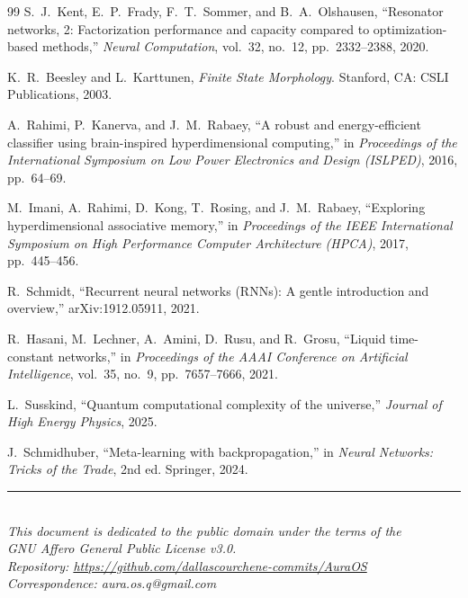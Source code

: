 \documentclass[11pt]{article}
\begin{document}
\begin{thebibliography}{99}
S.~J.~Kent, E.~P.~Frady, F.~T.~Sommer, and B.~A.~Olshausen, ``Resonator networks, 2: Factorization performance and capacity compared to optimization-based methods,'' \textit{Neural Computation}, vol.~32, no.~12, pp.~2332--2388, 2020.

K.~R.~Beesley and L.~Karttunen, \textit{Finite State Morphology}. Stanford, CA: CSLI Publications, 2003.

A.~Rahimi, P.~Kanerva, and J.~M.~Rabaey, ``A robust and energy-efficient classifier using brain-inspired hyperdimensional computing,'' in \textit{Proceedings of the International Symposium on Low Power Electronics and Design (ISLPED)}, 2016, pp.~64--69.

M.~Imani, A.~Rahimi, D.~Kong, T.~Rosing, and J.~M.~Rabaey, ``Exploring hyperdimensional associative memory,'' in \textit{Proceedings of the IEEE International Symposium on High Performance Computer Architecture (HPCA)}, 2017, pp.~445--456.

R.~Schmidt, ``Recurrent neural networks (RNNs): A gentle introduction and overview,'' arXiv:1912.05911, 2021.

R.~Hasani, M.~Lechner, A.~Amini, D.~Rusu, and R.~Grosu, ``Liquid time-constant networks,'' in \textit{Proceedings of the AAAI Conference on Artificial Intelligence}, vol.~35, no.~9, pp.~7657--7666, 2021.

L.~Susskind, ``Quantum computational complexity of the universe,'' \textit{Journal of High Energy Physics}, 2025.

J.~Schmidhuber, ``Meta-learning with backpropagation,'' in \textit{Neural Networks: Tricks of the Trade}, 2nd ed. Springer, 2024.

\end{thebibliography}

\vspace{12pt}
\begin{center}
\rule{0.5\textwidth}{0.4pt}\\[4pt]
\textit{This document is dedicated to the public domain under the terms of the}\\
\textit{GNU Affero General Public License v3.0.}\\[2pt]
\textit{Repository: \url{https://github.com/dallascourchene-commits/AuraOS}}\\[2pt]
\textit{Correspondence: aura.os.q@gmail.com}
\end{center}
\end{document}
